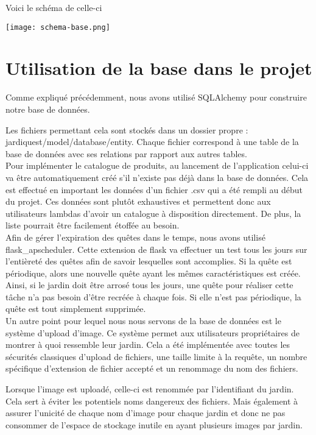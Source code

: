 \documentclass[12pt,titlepage]{report}
\begin{document}
Voici le schéma de celle-ci
\begin{center}
     \texttt{[image: schema-base.png]} 
\end{center}

\section{Utilisation de la base dans le projet}


Comme expliqué précédemment, nous avons utilisé SQLAlchemy pour construire notre base de données.

Les fichiers permettant cela sont stockés dans un dossier propre : jardiquest/model/database/entity. Chaque fichier correspond à une table de la base de données avec ses relations par rapport aux autres tables. \\

Pour implémenter le catalogue de produits, au lancement de l’application celui-ci va être automatiquement créé s’il n’existe pas déjà dans la base de données. Cela est effectué en important les données d’un fichier .csv qui a été rempli au début du projet. Ces données sont plutôt exhaustives et permettent donc aux utilisateurs lambdas d’avoir un catalogue à disposition directement. De plus, la liste pourrait être facilement étoffée au besoin. \\


Afin de gérer l’expiration des quêtes dans le temps, nous avons utilisé flask\_apscheduler. Cette extension de flask va effectuer un test tous les jours sur l'entièreté des quêtes afin de savoir lesquelles sont accomplies. Si la quête est périodique, alors une nouvelle quête ayant les mêmes caractéristiques est créée. Ainsi, si le jardin doit être arrosé tous les jours, une quête pour réaliser cette tâche n'a pas besoin d'être recréée à chaque fois. Si elle n'est pas périodique, la quête est tout simplement supprimée. \\

Un autre point pour lequel nous nous servons de la base de données est le système d’upload d'image. Ce système permet aux utilisateurs propriétaires de montrer à quoi ressemble leur jardin. Cela a été implémentée avec toutes les sécurités classiques d’upload de fichiers, une taille limite à la requête, un nombre spécifique d’extension de fichier accepté et un renommage du nom des fichiers.

Lorsque l'image est uploadé, celle-ci est renommée par l’identifiant du jardin. Cela sert à éviter les potentiels noms dangereux des fichiers. Mais également à assurer l'unicité de chaque nom d’image pour chaque jardin et donc ne pas consommer de l’espace de stockage inutile en ayant plusieurs images par jardin.
\end{document}
